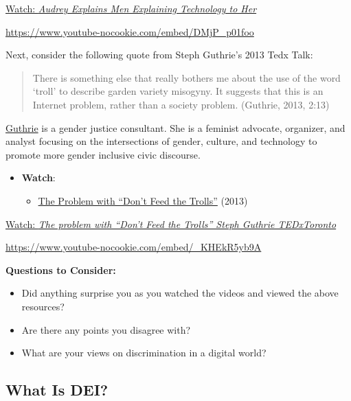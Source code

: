 \documentclass[
  letterpaper,
  DIV=11,
  numbers=noendperiod]{scrreprt}
\providecommand{\tightlist}{%
  \setlength{\itemsep}{0pt}\setlength{\parskip}{0pt}}\usepackage{longtable,booktabs,array}
\begin{document}
\begin{tcolorbox}
\href{https://www.youtube.com/watch?v=DMjP_p01foo}{Watch: \emph{Audrey
Explains Men Explaining Technology to Her}}

\url{https://www.youtube-nocookie.com/embed/DMjP_p01foo}

Next, consider the following quote from Steph Guthrie's 2013 Tedx Talk:

\begin{quote}
There is something else that really bothers me about the use of the word
`troll' to describe garden variety misogyny. It suggests that this is an
Internet problem, rather than a society problem. (Guthrie, 2013, 2:13)
\end{quote}

\href{https://stephguthrie.com/}{Guthrie} is a gender justice
consultant. She is a feminist advocate, organizer, and analyst focusing
on the intersections of gender, culture, and technology to promote more
gender inclusive civic discourse.

\begin{itemize}
\tightlist
\item
  \textbf{Watch}:

  \begin{itemize}
  \tightlist
  \item
    \href{https://www.youtube.com/watch?v=_KHEkR5yb9A}{The Problem with
    ``Don't Feed the Trolls''} (2013)
  \end{itemize}
\end{itemize}

\href{https://www.youtube.com/watch?v=_KHEkR5yb9A}{Watch: \emph{The
problem with ``Don't Feed the Trolls'' \textbar{} Steph Guthrie
\textbar{} TEDxToronto}}

\url{https://www.youtube-nocookie.com/embed/_KHEkR5yb9A}

\textbf{Questions to Consider:}

\begin{itemize}
\tightlist
\item
  Did anything surprise you as you watched the videos and viewed the
  above resources?
\item
  Are there any points you disagree with?
\item
  What are your views on discrimination in a digital world?
\end{itemize}

\end{tcolorbox}

\subsection*{What Is DEI?}\label{what-is-dei}
\end{document}
